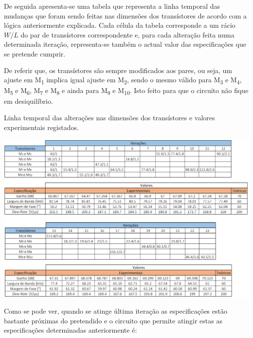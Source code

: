 \documentclass[11pt]{article}
\numberwithin{equation}{section}
\begin{document}
De seguida apresenta-se uma tabela que representa a linha temporal das mudanças que foram sendo feitas nas dimensões dos transístores de acordo com a lógica anteriormente explicada. Cada célula da tabela corresponde a um rácio $W/L$ do par de transístores correspondente e, para cada alteração feita numa determinada iteração, representa-se também o actual valor das especificações que se pretende cumprir.

De referir que, os transístores são sempre modificados aos pares, ou seja, um ajuste em M\textsubscript{1} implica igual ajuste em M\textsubscript{2}, sendo o mesmo válido para M\textsubscript{3} e M\textsubscript{4}, M\textsubscript{5} e M\textsubscript{6}, M\textsubscript{7} e M\textsubscript{8} e ainda para M\textsubscript{9} e M\textsubscript{10}. Isto feito para que o circuito não fique em desiquilíbrio.

\begin{table}[H]
	\centering
	\caption{Linha temporal das alterações nas dimensões dos transístores e valores experimentais registados.}
	\vspace{-1.5mm}
	\includegraphics[keepaspectratio=true, scale=0.40]{teoricas/tabelaF1}
\end{table}

Como se pode ver, quando se atinge última iteração as especificações estão bastante próximas do pretendido e o circuito que permite atingir estas as especificações determinadas anteriormente é:
\end{document}
